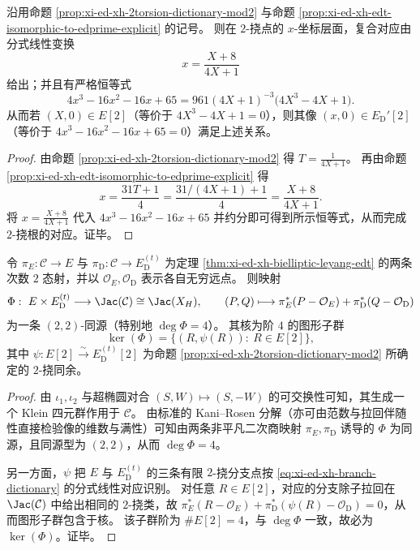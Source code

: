 \begin{corollary}\label{cor:xi-ed-xh-2torsion-dictionary-edprime}
沿用命题 \ref{prop:xi-ed-xh-2torsion-dictionary-mod2} 与命题 \ref{prop:xi-ed-xh-edt-isomorphic-to-edprime-explicit} 的记号。
则在 \(2\)-挠点的 \(x\)-坐标层面，复合对应由分式线性变换
\[
x=\frac{X+8}{4X+1}
\]
给出；并且有严格恒等式
\[
4x^3-16x^2-16x+65
=961(4X+1)^{-3}\bigl(4X^3-4X+1\bigr).
\]
从而若 \((X,0)\in E[2]\)（等价于 \(4X^3-4X+1=0\)），则其像 \((x,0)\in E_{\mathrm D}'[2]\)（等价于 \(4x^3-16x^2-16x+65=0\)）满足上述关系。
\end{corollary}
\begin{proof}
由命题 \ref{prop:xi-ed-xh-2torsion-dictionary-mod2} 得 \(T=\frac{1}{4X+1}\)。
再由命题 \ref{prop:xi-ed-xh-edt-isomorphic-to-edprime-explicit} 得
\[
x=\frac{31T+1}{4}=\frac{31/(4X+1)+1}{4}=\frac{X+8}{4X+1}.
\]
将 \(x=\frac{X+8}{4X+1}\) 代入 \(4x^3-16x^2-16x+65\) 并约分即可得到所示恒等式，从而完成 \(2\)-挠根的对应。证毕。
\end{proof}

\begin{theorem}\label{thm:xi-ed-xh-jacobian-22-isogeny-graph-kernel}
令 \(\pi_E:\mathcal C\to E\) 与 \(\pi_{\mathrm D}:\mathcal C\to E_{\mathrm D}^{(t)}\) 为定理 \ref{thm:xi-ed-xh-bielliptic-leyang-edt} 的两条次数 \(2\) 态射，并以 \(\mathcal O_E,\mathcal O_{\mathrm D}\) 表示各自无穷远点。
则映射
\[
\Phi:\ E\times E_{\mathrm D}^{(t)}\longrightarrow \Jac(\mathcal C)\cong \Jac(X_H),
\qquad
(P,Q)\longmapsto \pi_E^*(P-\mathcal O_E)+\pi_{\mathrm D}^*(Q-\mathcal O_{\mathrm D})
\]
为一条 \((2,2)\)-同源（特别地 \(\deg\Phi=4\)）。
其核为阶 \(4\) 的图形子群
\[
\ker(\Phi)=\{(R,\psi(R)):\ R\in E[2]\},
\]
其中 \(\psi:E[2]\xrightarrow{\sim}E_{\mathrm D}^{(t)}[2]\) 为命题 \ref{prop:xi-ed-xh-2torsion-dictionary-mod2} 所确定的 \(2\)-挠同余。
\end{theorem}
\begin{proof}
由 \(\iota_1,\iota_2\) 与超椭圆对合 \((S,W)\mapsto(S,-W)\) 的可交换性可知，其生成一个 Klein 四元群作用于 \(\mathcal C\)。
由标准的 Kani--Rosen 分解（亦可由范数与拉回伴随性直接检验像的维数与满性）可知由两条非平凡二次商映射 \(\pi_E,\pi_{\mathrm D}\) 诱导的 \(\Phi\) 为同源，且同源型为 \((2,2)\)，从而 \(\deg\Phi=4\)。
\par
另一方面，\(\psi\) 把 \(E\) 与 \(E_{\mathrm D}^{(t)}\) 的三条有限 \(2\)-挠分支点按 \eqref{eq:xi-ed-xh-branch-dictionary} 的分式线性对应识别。
对任意 \(R\in E[2]\)，对应的分支除子拉回在 \(\Jac(\mathcal C)\) 中给出相同的 \(2\)-挠类，故
\(\pi_E^*(R-\mathcal O_E)+\pi_{\mathrm D}^*(\psi(R)-\mathcal O_{\mathrm D})=0\)，从而图形子群包含于核。
该子群阶为 \(\#E[2]=4\)，与 \(\deg\Phi\) 一致，故必为 \(\ker(\Phi)\)。证毕。
\end{proof}

